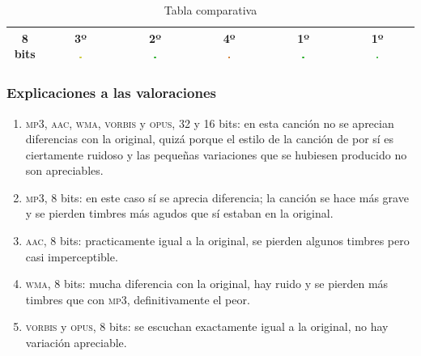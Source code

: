 \documentclass[11pt,a4paper]{article}
\begin{document}
\begin{table}[H]
\begin{tabular}{|c|c|c|c|c|c|}
 8 bits & \makecell{3º\\ \includegraphics[width=0.03\textwidth]{r.png}} & \makecell{2º\\ \includegraphics[width=0.03\textwidth]{mb.png}} & \makecell{4º\\ \includegraphics[width=0.03\textwidth]{m.png}} & \makecell{1º\\ \includegraphics[width=0.03\textwidth]{mb.png}} & \makecell{1º\\ \includegraphics[width=0.03\textwidth]{mb.png}} \\ \hline
\end{tabular}
\caption{Tabla comparativa}
\label{my-label}
\end{table}

\subsubsection{Explicaciones a las valoraciones}
\begin{enumerate}
	\item \textsc{mp3, aac, wma, vorbis} y \textsc{opus}, 32 y 16 bits: en esta canción no se aprecian diferencias con la original, quizá porque el estilo de la canción de por sí es ciertamente ruidoso y las pequeñas variaciones que se hubiesen producido no son apreciables.
	\item \textsc{mp3}, 8 bits: en este caso sí se aprecia diferencia; la canción se hace más grave y se pierden timbres más agudos que sí estaban en la original.
	\item \textsc{aac}, 8 bits: practicamente igual a la original, se pierden algunos timbres pero casi imperceptible.
	\item \textsc{wma}, 8 bits: mucha diferencia con la original, hay ruido y se pierden más timbres que con \textsc{mp3}, definitivamente el peor.
	\item \textsc{vorbis} y \textsc{opus}, 8 bits: se escuchan exactamente igual a la original, no hay variación apreciable.
\end{enumerate}
\end{document}
